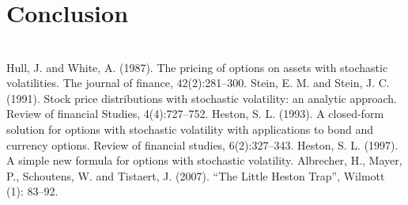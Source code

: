 \documentclass[11pt]{article}
\begin{document}
\section{Conclusion}


\newpage
\section*{} \label{bibsection}


\begin{thebibliography}{MMMMM} 
 Hull, J. and White, A. (1987). The pricing of options on assets
with stochastic volatilities. The journal of finance, 42(2):281--300.
 Stein, E. M. and Stein, J. C. (1991). Stock price distributions
with stochastic volatility: an analytic approach. Review of financial
Studies, 4(4):727--752.
 Heston, S. L. (1993). A closed-form solution for options with
stochastic volatility with applications to bond and currency options.
Review of financial studies, 6(2):327--343.
 Heston, S. L. (1997). A simple new formula for options with
stochastic volatility.
 Albrecher, H., Mayer, P., Schoutens, W. and Tistaert, J. (2007).
``The Little Heston Trap'', Wilmott (1): 83--92.

\end{thebibliography}
\end{document}

